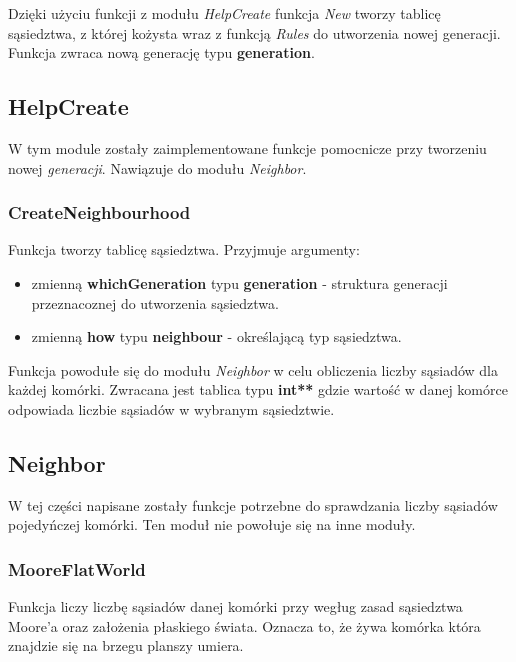 \documentclass[a4paper]{article}
\begin{document}
\quad Dzi\k{e}ki u\.zyciu funkcji z modu\l{}u \textit{HelpCreate} funkcja \textit{New} tworzy tablic\k{e} s\k{a}siedztwa, z kt\'orej ko\.zysta wraz z funkcj\k{a} \textit{Rules} do utworzenia nowej generacji. 
Funkcja zwraca now\k{a} generacj\k{e} typu \textbf{generation}.


\subsection{HelpCreate}

\quad W tym module zosta\l{}y zaimplementowane funkcje pomocnicze przy tworzeniu nowej \textit{generacji}.
Nawi\k{a}zuje do modu\l{}u \textit{Neighbor}.

\subsubsection{CreateNeighbourhood}

\quad Funkcja tworzy tablic\k{e} s\k{a}siedztwa. 
Przyjmuje argumenty:

\begin{itemize}
        \item zmienn\k{a} \textbf{whichGeneration} typu \textbf{generation} - struktura generacji przeznacoznej do utworzenia s\k{a}siedztwa.
        \item zmienn\k{a} \textbf{how} typu \textbf{neighbour} - okre\'slaj\k{a}c\k{a} typ s\k{a}siedztwa.
\end{itemize}

\quad Funkcja powodu\l{}e si\k{e} do modu\l{}u \textit{Neighbor} w celu obliczenia liczby s\k{a}siad\'ow dla ka\.zdej kom\'orki.
Zwracana jest tablica typu \textbf{int**} gdzie warto\'s\'c w danej kom\'orce odpowiada liczbie s\k{a}siad\'ow w wybranym s\k{a}siedztwie.

\subsection{Neighbor}

\quad W tej cz\k{e}\'sci napisane zosta\l{}y funkcje potrzebne do sprawdzania liczby s\k{a}siad\'ow pojedy\'nczej kom\'orki.
Ten modu\l{} nie powo\l{}uje si\k{e} na inne modu\l{}y.

\subsubsection{MooreFlatWorld}

\quad Funkcja liczy liczb\k{e} s\k{a}siad\'ow danej kom\'orki przy weg\l{}ug zasad s\k{a}siedztwa Moore'a oraz za\l{}o\.zenia p\l{}askiego \'swiata. 
Oznacza to, \.ze \.zywa kom\'orka kt\'ora znajdzie si\k{e} na brzegu planszy umiera.
\end{document}
